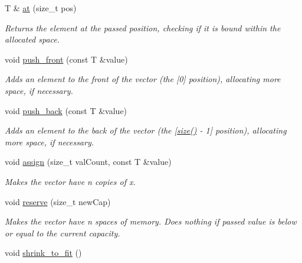 \begin{DoxyCompactItemize}
T \& \hyperlink{classsc_1_1Vector_a13736daa34984783b36b8abc0dfb8a5f}{at} (size\+\_\+t pos)
\begin{DoxyCompactList}\small\item\em Returns the element at the passed position, checking if it is bound within the allocated space. \end{DoxyCompactList}\item 
\mbox{\label{classsc_1_1Vector_a25f84345bd4aec4c0c2b1780b2d71733}} 
void \hyperlink{classsc_1_1Vector_a25f84345bd4aec4c0c2b1780b2d71733}{push\+\_\+front} (const T \&value)
\begin{DoxyCompactList}\small\item\em Adds an element to the front of the vector (the \mbox{[}0\mbox{]} position), allocating more space, if necessary. \end{DoxyCompactList}\item 
\mbox{\label{classsc_1_1Vector_a0e237975592931cbd9c35322af6566a5}} 
void \hyperlink{classsc_1_1Vector_a0e237975592931cbd9c35322af6566a5}{push\+\_\+back} (const T \&value)
\begin{DoxyCompactList}\small\item\em Adds an element to the back of the vector (the \mbox{[}\hyperlink{classsc_1_1Vector_a2ccab0421fad94601e6bd5e344aa3340}{size()} -\/ 1\mbox{]} position), allocating more space, if necessary. \end{DoxyCompactList}\item 
void \hyperlink{classsc_1_1Vector_a6b349db72f104336fe4bf06dffaa4979}{assign} (size\+\_\+t val\+Count, const T \&value)
\begin{DoxyCompactList}\small\item\em Makes the vector have n copies of x. \end{DoxyCompactList}\item 
void \hyperlink{classsc_1_1Vector_a16435ab7524542a2197d202f45dc80d8}{reserve} (size\+\_\+t new\+Cap)
\begin{DoxyCompactList}\small\item\em Makes the vector have n spaces of memory. Does nothing if passed value is below or equal to the current capacity. \end{DoxyCompactList}\item 
\mbox{\label{classsc_1_1Vector_a3353c5af380f7e50f87ca9a8199459e2}} 
void \hyperlink{classsc_1_1Vector_a3353c5af380f7e50f87ca9a8199459e2}{shrink\+\_\+to\+\_\+fit} ()

\end{DoxyCompactItemize}
